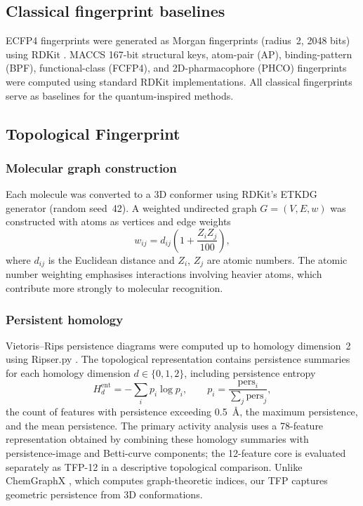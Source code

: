\documentclass[11pt,a4paper]{article}
\begin{document}
\subsection{Classical fingerprint baselines}

ECFP4 fingerprints were generated as Morgan fingerprints (radius~2, \num{2048} bits) using RDKit \citep{rdkit_2024}. MACCS \num{167}-bit structural keys, atom-pair (AP), binding-pattern (BPF), functional-class (FCFP4), and 2D-pharmacophore (PHCO) fingerprints were computed using standard RDKit implementations. All classical fingerprints serve as baselines for the quantum-inspired methods.

\subsection{Topological Fingerprint}

\subsubsection{Molecular graph construction}

Each molecule was converted to a 3D conformer using RDKit's ETKDG generator (random seed~42). A weighted undirected graph $G = (V, E, w)$ was constructed with atoms as vertices and edge weights
\begin{equation}
w_{ij} = d_{ij}\left(1 + \frac{Z_i Z_j}{100}\right),
\end{equation}
where $d_{ij}$ is the Euclidean distance and $Z_i$, $Z_j$ are atomic numbers. The atomic number weighting emphasises interactions involving heavier atoms, which contribute more strongly to molecular recognition.

\subsubsection{Persistent homology}

Vietoris--Rips persistence diagrams were computed up to homology dimension~2 using Ripser.py \citep{ripser_2019}. The topological representation contains persistence summaries for each homology dimension $d \in \{0, 1, 2\}$, including persistence entropy
\begin{equation}
H_d^{\mathrm{ent}} = -\sum_i p_i \log p_i, \qquad p_i = \frac{\mathrm{pers}_i}{\sum_j \mathrm{pers}_j},
\end{equation}
the count of features with persistence exceeding \SI{0.5}{\angstrom}, the maximum persistence, and the mean persistence. The primary activity analysis uses a 78-feature representation obtained by combining these homology summaries with persistence-image and Betti-curve components; the 12-feature core is evaluated separately as TFP-12 in a descriptive topological comparison. Unlike ChemGraphX \citep{chemgraphx_2026}, which computes graph-theoretic indices, our TFP captures geometric persistence from 3D conformations.
\end{document}
